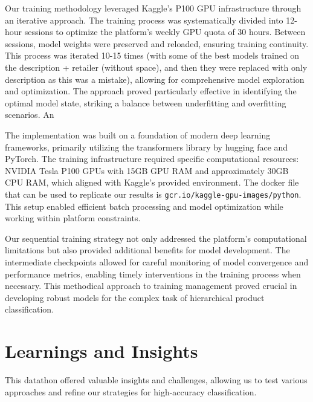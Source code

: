 \documentclass[9pt,a4paper,twoside]{rho-class/rho}
\begin{document}
    Our training methodology leveraged Kaggle's P100 GPU infrastructure through an iterative approach. The training process was systematically divided into 12-hour sessions to optimize the platform's weekly GPU quota of 30 hours. Between sessions, model weights were preserved and reloaded, ensuring training continuity. This process was iterated 10-15 times (with some of the best models trained on the description + retailer (without space), and then they were replaced with only description as this was a mistake), allowing for comprehensive model exploration and optimization. The approach proved particularly effective in identifying the optimal model state, striking a balance between underfitting and overfitting scenarios. An
    
    The implementation was built on a foundation of modern deep learning frameworks, primarily utilizing the transformers library by hugging face and PyTorch. The training infrastructure required specific computational resources: NVIDIA Tesla P100 GPUs with 15GB GPU RAM and approximately 30GB CPU RAM, which aligned with Kaggle's provided environment. The docker file that can be used to replicate our results is \texttt{gcr.io/kaggle-gpu-images/python}. This setup enabled efficient batch processing and model optimization while working within platform constraints.

    Our sequential training strategy not only addressed the platform's computational limitations but also provided additional benefits for model development. The intermediate checkpoints allowed for careful monitoring of model convergence and performance metrics, enabling timely interventions in the training process when necessary. This methodical approach to training management proved crucial in developing robust models for the complex task of hierarchical product classification.

\section{Learnings and Insights}

This datathon offered valuable insights and challenges, allowing us to test various approaches and refine our strategies for high-accuracy classification.
\end{document}
